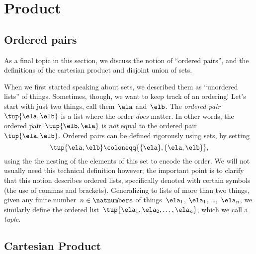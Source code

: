 \section{Product}

\subsection{Ordered pairs}\label{subsec:ordered-pairs}

As a final topic in this section, we discuss the notion of ``ordered pairs'', and the definitions of the cartesian product and disjoint union of sets.

When we first started speaking about sets, we described them as ``unordered lists'' of things.
Sometimes, though, we want to keep track of an ordering!
Let's start with just two things, call them~$\ela$ and~$\elb$.
The \emph{ordered pair}~$\tup{\ela,\elb}$ is a list where the order \emph{does} matter.
In other words, the ordered pair~$\tup{\elb,\ela}$ is \emph{not} equal to the ordered pair~$\tup{\ela,\elb}$.
Ordered pairs can be defined rigorously using sets, by setting
\begin{equation}
    \label{eq:ordered-pair}
    \tup{\ela, \elb} \coloneqq \{ \{\ela \} , \{ \ela, \elb \} \},
\end{equation}
using the the nesting of the elements of this set to encode the order.
We will not usually need this technical definition however;
the important point is to clarify that this notion describes ordered lists, specifically denoted with certain symbols (the use of commas and brackets).
Generalizing to lists of more than two things, given any finite number~$n \in \natnumbers$ of things~$\ela_1$, $\ela_1$, \dots,~$\ela_n$, we similarly define the ordered list~$\tup{\ela_1, \ela_2, \ldots , \ela_n}$, which we call a \emph{tuple}.

\subsection{Cartesian Product}

